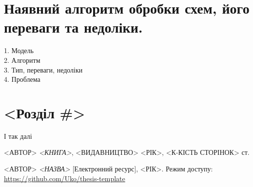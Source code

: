 \documentclass[12pt,a4paper]{article}
\begin{document}
\clearpage

\section{Наявний алгоритм обробки схем, його переваги та недоліки.}

1. Модель\\
2. Алгоритм\\
3. Тип, переваги, недоліки\\
4. Проблема

\clearpage

\section{<Розділ \#>}

І так далі\cite{web}

\clearpage

\begin{thebibliography}{9}

  <АВТОР> \emph{<КНИГА>},
    <ВИДАВНИЦТВО> <РІК>, <К-КІСТЬ СТОРІНОК> ст.
    
  <АВТОР> \emph{<НАЗВА>} [Електронний ресурс],
    <РІК>. Режим доступу:
    \url{https://github.com/Uko/thesis-template}

\end{thebibliography}
\end{document}
